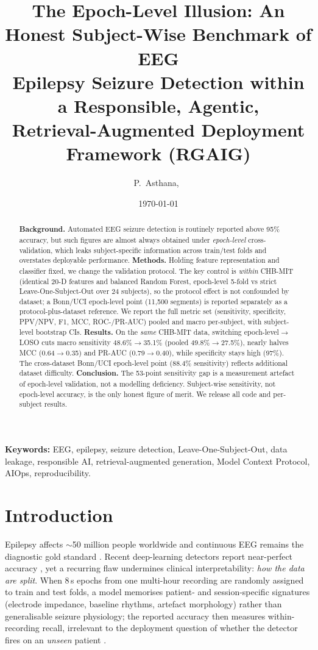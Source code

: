 \documentclass[10pt,journal,twocolumn]{IEEEtran}
\title{\textbf{The Epoch-Level Illusion: An Honest Subject-Wise Benchmark of EEG\\
Epilepsy Seizure Detection within a Responsible, Agentic,\\ Retrieval-Augmented Deployment Framework (RGAIG)}}
\author{P.~Asthana,~\IEEEmembership{NeuroAI Research Group}}
\date{\today}
\begin{document}
\maketitle

\begin{abstract}
\noindent\textbf{Background.} Automated EEG seizure detection is routinely reported above 95\% accuracy, but such figures are almost always obtained under \emph{epoch-level} cross-validation, which leaks subject-specific information across train/test folds and overstates deployable performance.
\textbf{Methods.} Holding feature representation and classifier fixed, we change the validation protocol. The key control is \emph{within} CHB-MIT (identical 20-D features and balanced Random Forest, epoch-level 5-fold vs strict Leave-One-Subject-Out over 24 subjects), so the protocol effect is not confounded by dataset; a Bonn/UCI epoch-level point (11{,}500 segments) is reported separately as a protocol-plus-dataset reference. We report the full metric set (sensitivity, specificity, PPV/NPV, F1, MCC, ROC-/PR-AUC) pooled and macro per-subject, with subject-level bootstrap CIs.
\textbf{Results.} On the \emph{same} CHB-MIT data, switching epoch-level$\rightarrow$LOSO cuts macro sensitivity 48.6\%$\rightarrow$35.1\% (pooled 49.8\%$\rightarrow$27.5\%), nearly halves MCC (0.64$\rightarrow$0.35) and PR-AUC (0.79$\rightarrow$0.40), while specificity stays high (97\%). The cross-dataset Bonn/UCI epoch-level point (88.4\% sensitivity) reflects additional dataset difficulty.
\textbf{Conclusion.} The 53-point sensitivity gap is a measurement artefact of epoch-level validation, not a modelling deficiency. Subject-wise sensitivity, not epoch-level accuracy, is the only honest figure of merit. We release all code and per-subject results.
\end{abstract}

\noindent\textbf{Keywords:} EEG, epilepsy, seizure detection, Leave-One-Subject-Out, data leakage, responsible AI, retrieval-augmented generation, Model Context Protocol, AIOps, reproducibility.

\section{Introduction}
Epilepsy affects $\sim$50 million people worldwide and continuous EEG remains the diagnostic gold standard \citep{ep241003385}. Recent deep-learning detectors report near-perfect accuracy \citep{ep250820535,ep210510358,ep251108861}, yet a recurring flaw undermines clinical interpretability: \emph{how the data are split}. When 8\,s epochs from one multi-hour recording are randomly assigned to train and test folds, a model memorises patient- and session-specific signatures (electrode impedance, baseline rhythms, artefact morphology) rather than generalisable seizure physiology; the reported accuracy then measures within-recording recall, irrelevant to the deployment question of whether the detector fires on an \emph{unseen} patient \citep{ep250515203,ep210203336}.
\end{document}
